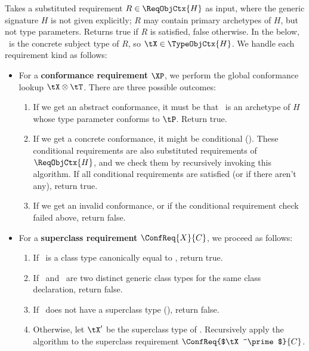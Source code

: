\documentclass[../generics]{subfiles}
\begin{document}
\begin{algorithm}\label{reqissatisfied}
Takes a substituted requirement $R\in\ReqObjCtx{H}$ as input, where the generic signature $H$ is not given explicitly; $R$ may contain primary archetypes of $H$, but not type parameters. Returns true if $R$ is satisfied, false otherwise. In the below, \tX\ is the concrete subject type of $R$, so $\tX\in\TypeObjCtx{H}$. We handle each requirement kind as follows:
\begin{itemize}
\item For a \textbf{conformance requirement} $\XP$, we perform the global conformance lookup $\tX \otimes \tT$. There are three possible outcomes:
\begin{enumerate}
\item If we get an abstract conformance, it must be that \tX\ is an archetype of $H$ whose type parameter conforms to $\tP$. Return true.
\item If we get a concrete conformance, it might be conditional (). These conditional requirements are also substituted requirements of $\ReqObjCtx{H}$, and we check them by recursively invoking this algorithm. If all conditional requirements are satisfied (or if there aren't any), return true.
\item If we get an invalid conformance, or if the conditional requirement check failed above, return false.
\end{enumerate}
\item For a \textbf{superclass requirement} $\ConfReq{X}{C}$, we proceed as follows:
\begin{enumerate}
\item If \tX\ is a class type canonically equal to \tC, return true.
\item If \tX\ and \tC\ are two distinct generic class types for the same class declaration, return false.
\item If \tX\ does not have a superclass type (), return false.
\item Otherwise, let $\tX^\prime$ be the superclass type of \tX. Recursively apply the algorithm to the superclass requirement $\ConfReq{$\tX^\prime$}{C}$.

\end{enumerate}
\end{itemize}
\end{algorithm}
\end{document}
